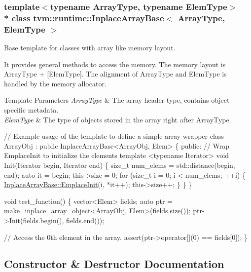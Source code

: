 \subsubsection*{template$<$typename Array\+Type, typename Elem\+Type$>$\\*
class tvm\+::runtime\+::\+Inplace\+Array\+Base$<$ Array\+Type, Elem\+Type $>$}

Base template for classes with array like memory layout. 

It provides general methods to access the memory. The memory layout is Array\+Type + \mbox{[}Elem\+Type\mbox{]}. The alignment of Array\+Type and Elem\+Type is handled by the memory allocator.


\begin{DoxyTemplParams}{Template Parameters}
{\em Array\+Type} & The array header type, contains object specific metadata. \\
\hline
{\em Elem\+Type} & The type of objects stored in the array right after Array\+Type.\\
\hline
\end{DoxyTemplParams}

\begin{DoxyCode}
\textcolor{comment}{// Example usage of the template to define a simple array wrapper}
\textcolor{keyword}{class }ArrayObj : \textcolor{keyword}{public} InplaceArrayBase<ArrayObj, Elem> \{
\textcolor{keyword}{public}:
 \textcolor{comment}{// Wrap EmplaceInit to initialize the elements}
 \textcolor{keyword}{template} <\textcolor{keyword}{typename} Iterator>
 \textcolor{keywordtype}{void} Init(Iterator begin, Iterator end) \{
  \textcolor{keywordtype}{size\_t} num\_elems = std::distance(begin, end);
  \textcolor{keyword}{auto} it = begin;
  this->size = 0;
  \textcolor{keywordflow}{for} (\textcolor{keywordtype}{size\_t} i = 0; i < num\_elems; ++i) \{
    \hyperlink{classtvm_1_1runtime_1_1InplaceArrayBase_a7900079ae38be41d93b522239d3ba4f2}{InplaceArrayBase::EmplaceInit}(i, *it++);
    this->size++;
  \}
 \}
\}

\textcolor{keywordtype}{void} test\_function() \{
  vector<Elem> fields;
  \textcolor{keyword}{auto} ptr = make\_inplace\_array\_object<ArrayObj, Elem>(fields.size());
  ptr->Init(fields.begin(), fields.end());

  \textcolor{comment}{// Access the 0th element in the array.}
  assert(ptr->operator[](0) == fields[0]);
\}
\end{DoxyCode}
 

\subsection{Constructor \& Destructor Documentation}
